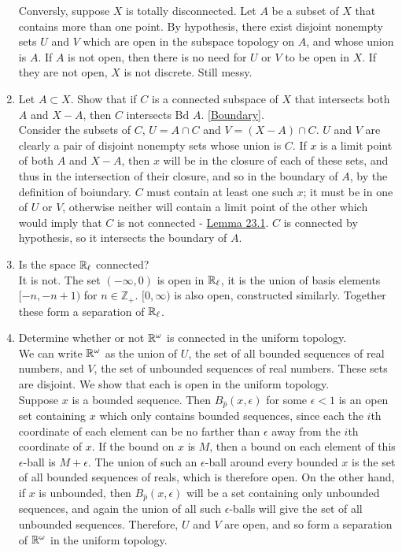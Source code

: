 \documentclass[12pt,letterpaper]{article}
\begin{document}
\begin{enumerate}
  Conversly, suppose $X$ is totally disconnected. Let $A$ be a subset of $X$ that contains more than one point. By hypothesis, there exist disjoint nonempty sets $U$ and $V$ which are open in the subspace topology on $A$, and whose union is $A$. If $A$ is not open, then there is no need for $U$ or $V$ to be open in $X$. If they are not open, $X$ is not discrete. Still messy.\\
  \item Let $A\subset X$. Show that if $C$ is a connected subspace of $X$ that intersects both $A$ and $X-A$, then $C$ intersects $\text{Bd } A$. [\hyperref[dfn:boundary]{Boundary}].\\
  Consider the subsets of $C$, $U=A\cap C$ and $V=(X-A)\cap C$. $U$ and $V$ are clearly a pair of disjoint nonempty sets whose union is $C$. If $x$ is a limit point of both $A$ and $X-A$, then $x$ will be in the closure of each of these sets, and thus in the intersection of their closure, and so in the boundary of $A$, by the definition of boiundary. $C$ must contain at least one such $x$; it must be in one of $U$ or $V$, otherwise neither will contain a limit point of the other which would imply that $C$ is not connected - \hyperref[dfn:subspaceSeparation]{Lemma 23.1}. $C$ is connected by hypothesis, so it intersects the boundary of $A$.
  \item Is the space \hyperref[dfn:lowerLimitTopology]{$\mathbb{R}_\ell$} connected? \\
  It is not. The set $(-\infty,0)$ is open in $\mathbb{R}_\ell$, it is the union of basis elements $[-n,-n+1)$ for $n\in\mathbb{Z}_+$. $[0,\infty)$ is also open, constructed similarly. Together these form a separation of $\mathbb{R}_\ell$.
  \item Determine whether or not $\mathbb{R}^\omega$ is connected in the uniform topology. \\
  We can write $\mathbb{R}^\omega$ as the union of $U$, the set of all bounded sequences of real numbers, and $V$, the set of unbounded sequences of real numbers. These sets are disjoint. We show that each is open in the uniform topology.\\
  Suppose $x$ is a bounded sequence. Then $B_{\bar{p}}(x,\epsilon)$ for some $\epsilon<1$ is an open set containing $x$ which only contains bounded sequences, since each the $i$th coordinate of each element can be no farther than $\epsilon$ away from the $i$th coordinate of $x$. If the bound on $x$ is $M$, then a bound on each element of this $\epsilon$-ball is $M+\epsilon$. The union of such an $\epsilon$-ball around every bounded $x$ is the set of all bounded sequences of reals, which is therefore open. On the other hand, if $x$ is unbounded, then $B_{\bar{p}}(x,\epsilon)$ will be a set containing only unbounded sequences, and again the union of all such $\epsilon$-balls will give the set of all unbounded sequences. Therefore, $U$ and $V$ are open, and so form a separation of $\mathbb{R}^\omega$ in the uniform topology.

\end{enumerate}
\end{document}
